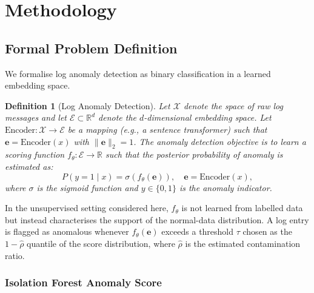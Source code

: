 \documentclass[conference]{IEEEtran}
\newtheorem{definition}{Definition}
\begin{document}
\section{Methodology}
\label{sec:methodology}

\subsection{Formal Problem Definition}

We formalise log anomaly detection as binary classification in a learned
embedding space.

\begin{definition}[Log Anomaly Detection]
Let $\mathcal{X}$ denote the space of raw log messages and let
$\mathcal{E} \subset \mathbb{R}^d$ denote the $d$-dimensional embedding
space.  Let $\text{Encoder}: \mathcal{X} \to \mathcal{E}$ be a mapping
(e.g., a sentence transformer) such that $\mathbf{e} = \text{Encoder}(x)$
with $\|\mathbf{e}\|_2 = 1$.  The anomaly detection objective is to learn a
scoring function $f_\theta: \mathcal{E} \to \mathbb{R}$ such that the
posterior probability of anomaly is estimated as:
\begin{equation}
P(y = 1 \mid x) = \sigma\!\left(f_\theta\!\left(\mathbf{e}\right)\right),
\quad \mathbf{e} = \text{Encoder}(x),
\label{eq:main_objective}
\end{equation}
where $\sigma$ is the sigmoid function and $y \in \{0, 1\}$ is the
anomaly indicator.
\end{definition}

In the unsupervised setting considered here, $f_\theta$ is not learned
from labelled data but instead characterises the support of the normal-data
distribution.  A log entry is flagged as anomalous whenever $f_\theta(\mathbf{e})$
exceeds a threshold $\tau$ chosen as the $1-\hat{\rho}$ quantile of the
score distribution, where $\hat{\rho}$ is the estimated contamination ratio.

\subsubsection{Isolation Forest Anomaly Score}
\end{document}
